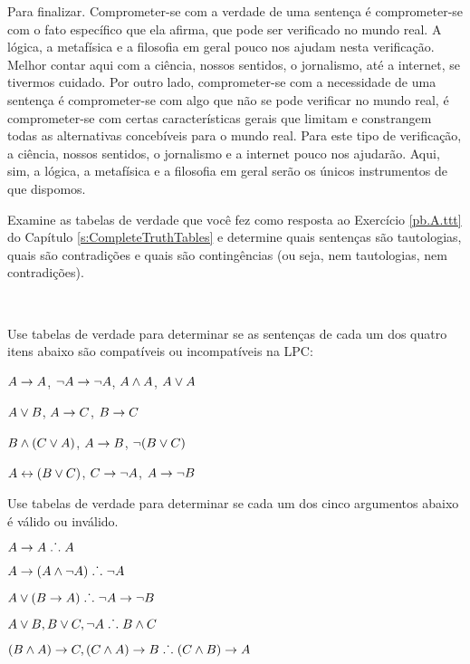 Para finalizar.
Comprometer-se com a verdade de uma sentença é comprometer-se com o fato específico que ela afirma, que pode ser verificado no mundo real.
A lógica, a metafísica e a filosofia em geral pouco nos ajudam nesta verificação.
Melhor contar aqui com a ciência, nossos sentidos, o jornalismo, até a internet, se tivermos cuidado.
Por outro lado, comprometer-se com a necessidade de uma sentença é comprometer-se com algo que não se pode verificar no mundo real, é comprometer-se com certas características gerais que limitam e constrangem todas as alternativas concebíveis para o mundo real.
Para este tipo de verificação, a ciência, nossos sentidos, o jornalismo e a internet pouco nos ajudarão.
Aqui, sim, a lógica, a metafísica e a filosofia em geral serão os únicos instrumentos de que dispomos.


\practiceproblems
\problempart
Examine as tabelas de verdade que você fez como resposta ao Exercício \ref{pb.A.ttt} do Capítulo \ref{s:CompleteTruthTables} e determine quais sentenças são tautologias, quais são contradições e quais são contingências (ou seja, nem tautologias, nem contradições).
\solutions

\

\problempart
\label{pr.TT.satisfiable}
Use tabelas de verdade para determinar se as sentenças de cada um dos quatro itens abaixo são compatíveis ou incompatíveis na LPC:
\begin{earg}
\item $A\rightarrow A$, $\neg A \rightarrow \neg A$, $A\wedge A$, $A\vee A$ %
\item $A\vee B$, $A\rightarrow C$, $B\rightarrow C$ %
\item $B\wedge(C\vee A)$, $A\rightarrow B$, $\neg(B\vee C)$  %
\item $A\leftrightarrow(B\vee C)$, $C\rightarrow \neg A$, $A\rightarrow \neg B$ %
\end{earg}


\solutions
\problempart
\label{pr.TT.valid}
Use tabelas de verdade para determinar se cada um dos cinco argumentos abaixo é válido ou inválido.
\begin{earg}
\item $A\rightarrow A \mathrel{\ldotp\dot{}\,\ldotp} A$ %
\item $A\rightarrow(A\wedge\neg A) \mathrel{\ldotp\dot{}\,\ldotp} \neg A$ %
\item $A\vee(B\rightarrow A) \mathrel{\ldotp\dot{}\,\ldotp} \neg A \rightarrow \neg B$ %
\item $A\vee B, B\vee C, \neg A \mathrel{\ldotp\dot{}\,\ldotp} B \wedge C$ %
\item $(B\wedge A)\rightarrow C, (C\wedge A)\rightarrow B \mathrel{\ldotp\dot{}\,\ldotp} (C\wedge B)\rightarrow A$ %
\end{earg}

